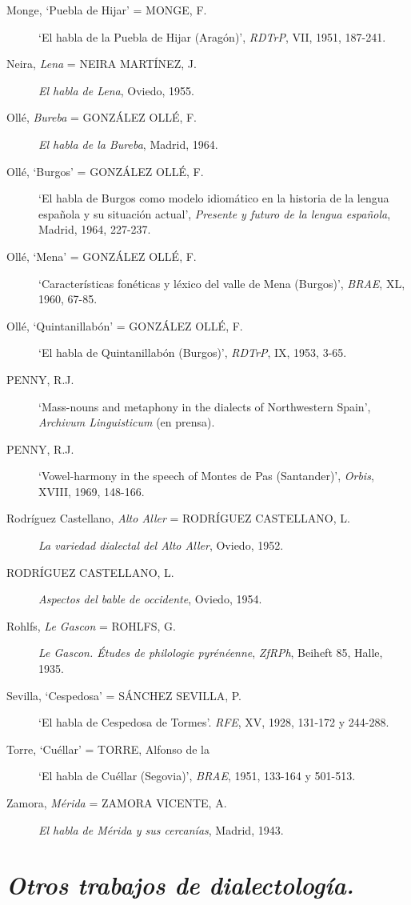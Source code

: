 \begin{description}
\item[Monge, `Puebla de Hijar' = MONGE, F.] `El habla de la Puebla de Hijar (Aragón)', \textit{RDTrP}, VII, 1951, 187-241.
\item[Neira, \textit{Lena} = NEIRA MARTÍNEZ, J.] \textit{El habla de Lena}, Oviedo, 1955.
\item[Ollé, \textit{Bureba} = GONZÁLEZ OLLÉ, F.] \textit{El habla de la Bureba}, Madrid, 1964.
\item[Ollé, `Burgos' = GONZÁLEZ OLLÉ, F.] `El habla de Burgos como modelo idiomático en la historia de la lengua española y su situación actual', \textit{Presente y futuro de la lengua española}, Madrid, 1964, 227-237.
\item[Ollé, `Mena' = GONZÁLEZ OLLÉ, F.] `Características fonéticas y léxico del valle de Mena (Burgos)', \textit{BRAE}, XL, 1960, 67-85.
\item[Ollé, `Quintanillabón' = GONZÁLEZ OLLÉ, F.] `El habla de Quintanillabón (Burgos)', \textit{RDTrP}, IX, 1953, 3-65.
\item[PENNY, R.J.] `Mass-nouns and metaphony in the dialects of Northwestern Spain', \textit{Archivum Linguisticum} (en prensa).
\item[PENNY, R.J.] `Vowel-harmony in the speech of Montes de Pas (Santander)', \textit{Orbis}, XVIII, 1969, 148-166. 
\item[Rodríguez Castellano, \textit{Alto Aller} = RODRÍGUEZ CASTELLANO, L.] \textit{La variedad dialectal del Alto Aller}, Oviedo, 1952. 
\item[RODRÍGUEZ CASTELLANO, L.] \textit{Aspectos del bable de occidente}, Oviedo, 1954. 
\item[Rohlfs, \textit{Le Gascon} = ROHLFS, G.] \textit{Le Gascon. Études de philologie pyrénéenne}, \textit{ZfRPh}, Beiheft 85, Halle, 1935.
\item[Sevilla, `Cespedosa' = SÁNCHEZ SEVILLA, P.] `El habla de Cespedosa de Tormes'. \textit{RFE}, XV, 1928, 131-172 y 244-288.
\item[Torre, `Cuéllar' = TORRE, Alfonso de la] `El habla de Cuéllar (Segovia)', \textit{BRAE}, 1951, 133-164 y 501-513. 
\item[Zamora, \textit{Mérida} = ZAMORA VICENTE, A.] \textit{El habla de Mérida y sus cercanías}, Madrid, 1943.
\end{description}


\section{\emph{Otros trabajos de dialectología.}}
\setcounter{subsection}{18}

